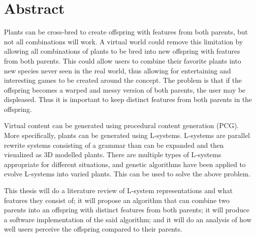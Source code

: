 \chapter*{Abstract}

Plants can be cross-bred to create offspring with features from both parents, but not all combinations will work.
A virtual world could remove this limitation by allowing all combinations of plants to be bred into new offspring with features from both parents.
This could allow users to combine their favorite plants into new species never seen in the real world, thus allowing for entertaining and interesting games to be created around the concept.
The problem is that if the offspring becomes a warped and messy version of both parents, the user may be displeased.
Thus it is important to keep distinct features from both parents in the offspring.

Virtual content can be generated using procedural content generation (PCG).
More specifically, plants can be generated using L-systems.
L-systems are parallel rewrite systems consisting of a grammar than can be expanded and then visualized as 3D modelled plants.
There are multiple types of L-systems appropriate for different situations, and genetic algorithms have been applied to evolve L-systems into varied plants.
This can be used to solve the above problem.

This thesis will do a literature review of L-system representations and what features they consist of; it will propose an algorithm that can combine two parents into an offspring with distinct features from both parents; it will produce a software implementation of the said algorithm; and it will do an analysis of how well users perceive the offspring compared to their parents.

\hypersetup{pageanchor=false}
